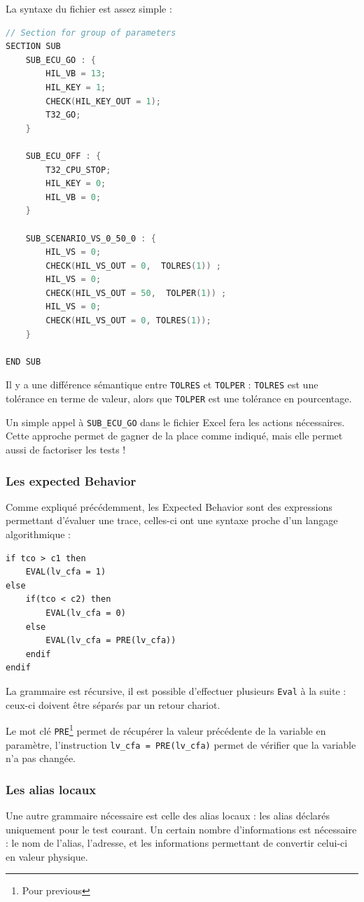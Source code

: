 	La syntaxe du fichier est assez simple :
\begin{lstlisting}[caption=Exemple de fichier cnf, language=C]
// Section for group of parameters
SECTION SUB
	SUB_ECU_GO : {
		HIL_VB = 13;
 		HIL_KEY = 1;
		CHECK(HIL_KEY_OUT = 1);
		T32_GO;
	}

	SUB_ECU_OFF : {
		T32_CPU_STOP;
 		HIL_KEY = 0;
		HIL_VB = 0;
	}

	SUB_SCENARIO_VS_0_50_0 : {
		HIL_VS = 0;
		CHECK(HIL_VS_OUT = 0,  TOLRES(1)) ;
		HIL_VS = 0;
		CHECK(HIL_VS_OUT = 50,  TOLPER(1)) ;
		HIL_VS = 0;
		CHECK(HIL_VS_OUT = 0, TOLRES(1));
	}

END SUB
\end{lstlisting}
\begin{remarque}
Il y a une différence sémantique entre \texttt{TOLRES} et \texttt{TOLPER} : \texttt{TOLRES} est une tolérance en terme de valeur, alors que \texttt{TOLPER} est une tolérance en pourcentage. 
\end{remarque}
Un simple appel à \texttt{SUB\_ECU\_GO} dans le fichier Excel fera les actions nécessaires. Cette approche permet de gagner de la place comme indiqué, mais elle permet aussi de factoriser les tests !

	\subsubsection{Les expected Behavior}
Comme expliqué précédemment, les Expected Behavior sont des expressions permettant d'évaluer une trace, celles-ci ont une syntaxe proche d'un langage algorithmique : 
\begin{lstlisting}[caption=Exemple d'expected Behavior, language=Algo]
if tco > c1 then 
	EVAL(lv_cfa = 1)
else
	if(tco < c2) then 
		EVAL(lv_cfa = 0)
	else           
		EVAL(lv_cfa = PRE(lv_cfa))
	endif
endif
\end{lstlisting}
La grammaire est récursive, il est possible d'effectuer plusieurs \texttt{Eval} à la suite : ceux-ci doivent être séparés par un retour chariot.

Le mot clé \texttt{PRE}\footnote{Pour previous} permet de récupérer la valeur précédente de la variable en paramètre, l'instruction \texttt{lv\_cfa = PRE(lv\_cfa)} permet de vérifier que la variable n'a pas changée.

\subsubsection{Les alias locaux}
Une autre grammaire nécessaire est celle des alias locaux : les alias déclarés uniquement pour le test courant. Un certain nombre d'informations est nécessaire : le nom de l'alias, l'adresse, et les informations permettant de convertir celui-ci en valeur physique.

